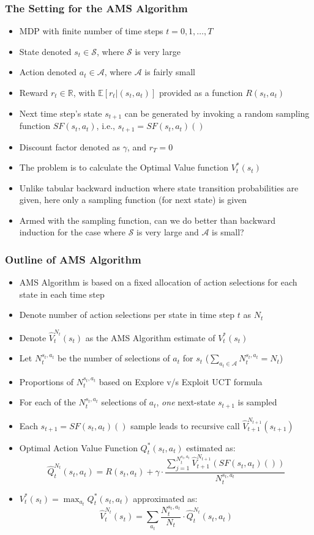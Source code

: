 \documentclass[handout]{beamer}
\begin{document}
\begin{frame}
\frametitle{The Setting for the AMS Algorithm}
\begin{itemize}
\item MDP with finite number of time steps $t=0, 1, \ldots, T$
\item State denoted $s_t \in \mathcal{S}$, where $\mathcal{S}$ is very large
\item Action denoted $a_t \in \mathcal{A}$, where $\mathcal{A}$ is fairly small
\item Reward $r_t \in \mathbb{R}$, with $\mathbb{E}[r_t|(s_t, a_t)]$ provided as a function $R(s_t,a_t)$
\item Next time step's state $s_{t+1}$ can be generated by invoking a random sampling function $SF(s_t,a_t)$, i.e., $s_{t+1} = SF(s_t, a_t)()$
\item Discount factor denoted as $\gamma$, and $r_T = 0$
\item The problem is to calculate the Optimal Value function $V_t^*(s_t)$
\item Unlike tabular backward induction where state transition probabilities are given, here only a sampling function (for next state) is given
\item Armed with the sampling function, can we do better than backward induction for the case where $\mathcal{S}$ is very large and $\mathcal{A}$ is small?
\end{itemize}
\end{frame}

\begin{frame}
\frametitle{Outline of AMS Algorithm}
\begin{itemize}
\item AMS Algorithm is based on a fixed allocation of action selections for each state in each time step
\item Denote number of action selections per state in time step $t$ as $N_t$
\item Denote $\hat{V}_t^{N_t}(s_t)$ as the AMS Algorithm estimate of $V_t^*(s_t)$
\item Let $N_t^{s_t,a_t}$ be the number of selections of $a_t$ for $s_t$ ($\sum_{a_t \in \mathcal{A}} N_t^{s_t,a_t} = N_t$)
\item Proportions of $N_t^{s_t,a_t}$ based on {Explore v/s Exploit} UCT formula
\item For each of the $N_t^{s_t,a_t}$ selections of $a_t$, {\em one} next-state $s_{t+1}$ is sampled
\item Each $s_{t+1} = SF(s_t,a_t)()$ sample leads to recursive call $\hat{V}_{t+1}^{N_{t+1}}(s_{t+1})$
\item Optimal Action Value Function $Q_t^*(s_t, a_t)$ estimated as:
$$\hat{Q}_t^{N_t}(s_t,a_t) = R(s_t,a_t) + \gamma \cdot \frac {\sum_{j=1}^{N_t^{s_t,a_t}} \hat{V}_{t+1}^{N_{t+1}}(SF(s_t,a_t)())} {N_t^{s_t,a_t}}$$
\item $V_t^*(s_t) = \max_{a_t} Q_t^*(s_t,a_t)$ approximated as:
$$\hat{V}_t^{N_t}(s_t) = \sum_{a_t} \frac {N_t^{s_t,a_t}} {N_t} \cdot \hat{Q}_t^{N_t}(s_t,a_t)$$
\end{itemize}
\end{frame}
\end{document}
